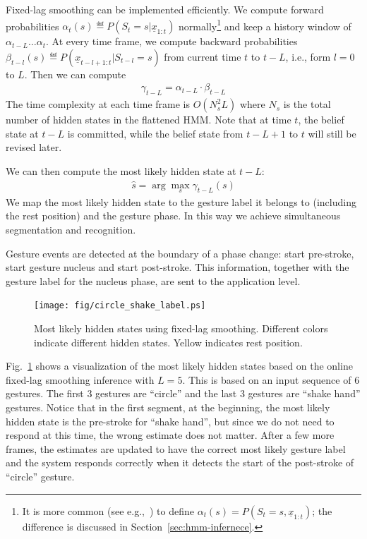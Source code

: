 Fixed-lag smoothing can be implemented efficiently. We compute forward
probabilities $\alpha_t(s) \eqdef P(S_t = s|\underline{x}_{1:t})$
normally\footnote{It is more common (see e.g.,~\cite{Rabiner90}) to define
$\alpha_t(s) = P(S_t = s, \underline{x}_{1:t})$; the difference is discussed in
Section~\ref{sec:hmm-infernece}.} and keep a history window of
$\alpha_{t - L}\ldots\alpha_t$.
At every time frame, we compute backward probabilities $\beta_{t-l}(s)\eqdef
P(\underline{x}_{t-l+1:t}|S_{t-l}=s)$ from current time $t$ to $t - L$, i.e.,
form $l=0$ to $L$.
Then we can compute
\begin{align}
\gamma_{t - L} = \alpha_{t - L} \cdot \beta_{t - L}
\end{align}  
The time complexity at each time frame is $O(N_s^2L)$ where $N_s$ is the total
number of hidden states in the flattened HMM. Note that at time $t$, the belief
state at $t - L$ is committed, while the belief state from $t - L + 1$ to $t$ will still be revised later.

We can then compute the most likely hidden state at $t - L$:
\begin{align}
\hat{s} = \arg\max_s \gamma_{t - L}(s)
\end{align}
We map the most likely hidden state to the gesture label it
belongs to (including the rest position) and the gesture phase. In this way
we achieve simultaneous segmentation and recognition.

Gesture events are detected at the boundary of a phase change: start pre-stroke,
start gesture nucleus and start post-stroke. This information, together with the
gesture label for the nucleus phase, are sent to the application level.

\begin{figure}[t]
\centering
\texttt{[image: fig/circle\_shake\_label.ps]}
\caption{Most likely hidden states using fixed-lag smoothing. Different colors indicate different hidden states. Yellow indicates rest position.}
\label{fig:visual_hidden}
\end{figure}

Fig.~\ref{fig:visual_hidden} shows a visualization of the
most likely hidden states based on the online fixed-lag smoothing inference
with $L = 5$.
This is based on an input sequence of 6 gestures. The first 3 gestures are
``circle'' and the last 3 gestures are ``shake hand'' gestures. Notice that in
the first segment, at the beginning, the most likely hidden state is the
pre-stroke for ``shake hand'', but since we do not need to respond at this time,
the wrong estimate does not matter. After a few more frames, the estimates are
updated to have the correct most likely gesture label and the system
responds correctly when it detects the start of the post-stroke of ``circle''
gesture.

